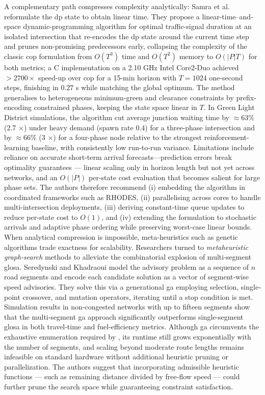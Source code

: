 A complementary path compresses complexity analytically: Samra et al. \cite{Samra2015} reformulate the \ac{dp} state to obtain linear time. They propose a linear-time–and-space dynamic-programming algorithm for optimal traffic-signal duration at an isolated intersection that re-encodes the \ac{dp} state around the current time step and prunes non-promising predecessors early, collapsing the complexity of the classic \ac{cop} formulation from $O(T^{3})$ time and $O(T^{2})$ memory to $O(|P|T)$ for both metrics; a C implementation on a 2.10 GHz Intel Core2-Duo achieved $>2700\times$ speed-up over \ac{cop} for a 15-min horizon with $T\!=\!1024$ one-second steps, finishing in $0.27$ s while matching the global optimum.  The method generalises to heterogeneous minimum-green and clearance constraints by prefix-encoding constrained phases, keeping the state space linear in $T$.  In Green Light District simulations, the algorithm cut average junction waiting time by $\approx63\%$ (2.7 ×) under heavy demand (spawn rate 0.4) for a three-phase intersection and by $\approx66\%$ (3 ×) for a four-phase node relative to the strongest reinforcement-learning baseline, with consistently low run-to-run variance.  Limitations include reliance on accurate short-term arrival forecasts—prediction errors break optimality guarantees --- linear scaling only in horizon length but not yet across networks, and an $O(|P|)$ per-state cost evaluation that becomes salient for large phase sets. The authors therefore recommend (i) embedding the algorithm in coordinated frameworks such as RHODES, (ii) parallelising across cores to handle multi-intersection deployments, (iii) deriving constant-time queue updates to reduce per-state cost to $O(1)$, and (iv) extending the formulation to stochastic arrivals and adaptive phase ordering while preserving worst-case linear bounds.
\mynewline
When analytical compression is impossible, meta-heuristics such as genetic algorithms trade exactness for scalability. Researchers turned to \emph{metaheuristic graph‐search} methods to alleviate the combinatorial explosion of multi‐segment \ac{glosa}. Seredynski and Khadraoui \cite{Seredynski2013} model the advisory problem as a sequence of $n$ road segments and encode each candidate solution as a vector of segment‐wise speed advisories. They solve this via a generational \ac{ga} employing selection, single‐point crossover, and mutation operators, iterating until a stop condition is met. Simulation results in non‐congested networks with up to fifteen segments show that the multi‐segment \ac{ga} approach significantly outperforms single‐segment \ac{glosa} in both travel‐time and fuel‐efficiency metrics. Although \ac{ga} circumvents the exhaustive enumeration required by \dp, its runtime still grows exponentially with the number of segments, and scaling beyond moderate route lengths remains infeasible on standard hardware without additional heuristic pruning or parallelization. The authors suggest that incorporating admissible heuristic functions --- such as remaining distance divided by free‐flow speed --- could further prune the search space while guaranteeing constraint satisfaction. 
